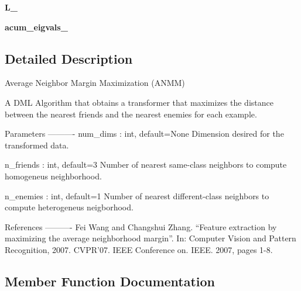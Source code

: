 \begin{DoxyCompactItemize}
\item 
{\bfseries L\+\_\+}\hypertarget{classdml_1_1anmm_1_1ANMM_a655790def54adbb2cd503f1e974952a0}{}\label{classdml_1_1anmm_1_1ANMM_a655790def54adbb2cd503f1e974952a0}

\item 
{\bfseries acum\+\_\+eigvals\+\_\+}\hypertarget{classdml_1_1anmm_1_1ANMM_acab0aceabe6f76580aa8bc180c463376}{}\label{classdml_1_1anmm_1_1ANMM_acab0aceabe6f76580aa8bc180c463376}

\end{DoxyCompactItemize}


\subsection{Detailed Description}
\begin{DoxyVerb}Average Neighbor Margin Maximization (ANMM)

A DML Algorithm that obtains a transformer that maximizes the distance between the nearest friends and the nearest enemies for each example.

Parameters
----------
num_dims : int, default=None
    Dimension desired for the transformed data.

n_friends : int, default=3
    Number of nearest same-class neighbors to compute homogeneus neighborhood.

n_enemies : int, default=1
    Number of nearest different-class neighbors to compute heterogeneus neigborhood.

References
----------
    Fei Wang and Changshui Zhang. “Feature extraction by maximizing the average neighborhood
    margin”. In: Computer Vision and Pattern Recognition, 2007. CVPR’07. IEEE Conference on.
    IEEE. 2007, pages 1-8.
\end{DoxyVerb}
 

\subsection{Member Function Documentation}
